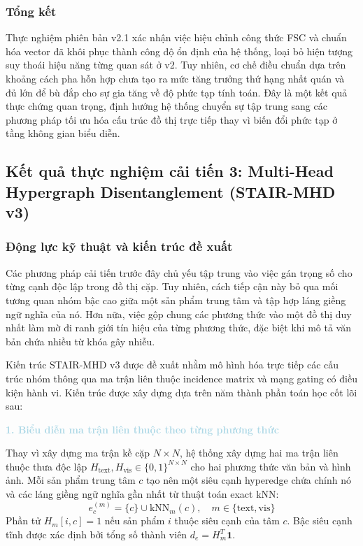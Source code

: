 \subsubsection{Tổng kết}

Thực nghiệm phiên bản v2.1 xác nhận việc hiệu chỉnh công thức FSC và chuẩn hóa vector đã khôi phục thành công độ ổn định của hệ thống, loại bỏ hiện tượng suy thoái hiệu năng từng quan sát ở v2. Tuy nhiên, cơ chế điều chuẩn dựa trên khoảng cách pha hỗn hợp chưa tạo ra mức tăng trưởng thứ hạng nhất quán và đủ lớn để bù đắp cho sự gia tăng về độ phức tạp tính toán. Đây là một kết quả thực chứng quan trọng, định hướng hệ thống chuyển sự tập trung sang các phương pháp tối ưu hóa cấu trúc đồ thị trực tiếp thay vì biến đổi phức tạp ở tầng không gian biểu diễn.

\subsection{Kết quả thực nghiệm cải tiến 3: Multi-Head Hypergraph Disentanglement (STAIR-MHD v3)}

\subsubsection{Động lực kỹ thuật và kiến trúc đề xuất}

Các phương pháp cải tiến trước đây chủ yếu tập trung vào việc gán trọng số cho từng cạnh độc lập trong đồ thị cặp. Tuy nhiên, cách tiếp cận này bỏ qua mối tương quan nhóm bậc cao giữa một sản phẩm trung tâm và tập hợp láng giềng ngữ nghĩa của nó. Hơn nữa, việc gộp chung các phương thức vào một đồ thị duy nhất làm mờ đi ranh giới tín hiệu của từng phương thức, đặc biệt khi mô tả văn bản chứa nhiều từ khóa gây nhiễu.

Kiến trúc STAIR-MHD v3 được đề xuất nhằm mô hình hóa trực tiếp các cấu trúc nhóm thông qua ma trận liên thuộc incidence matrix và mạng gating có điều kiện hành vi. Kiến trúc được xây dựng dựa trên năm thành phần toán học cốt lõi sau:

\noindent\textcolor{lightblue}{\textbf{1. Biểu diễn ma trận liên thuộc theo từng phương thức}}

Thay vì xây dựng ma trận kề cặp $N \times N$, hệ thống xây dựng hai ma trận liên thuộc thưa độc lập $H_{\text{text}}, H_{\text{vis}} \in \{0, 1\}^{N \times N}$ cho hai phương thức văn bản và hình ảnh. Mỗi sản phẩm trung tâm $c$ tạo nên một siêu cạnh hyperedge chứa chính nó và các láng giềng ngữ nghĩa gần nhất từ thuật toán exact kNN:
\begin{equation}
e_c^{(m)} = \{c\} \cup \text{kNN}_m(c), \quad m \in \{\text{text}, \text{vis}\}
\end{equation}
Phần tử $H_m[i, c] = 1$ nếu sản phẩm $i$ thuộc siêu cạnh của tâm $c$. Bậc siêu cạnh tĩnh được xác định bởi tổng số thành viên $d_e = H_m^T \mathbf{1}$.

